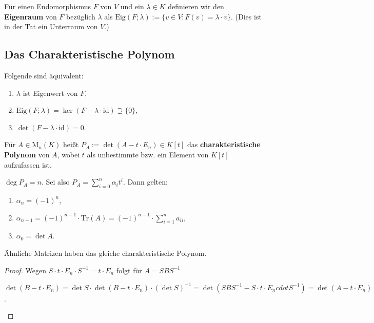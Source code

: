 \begin{definition} Für einen Endomorphismus $F$ von $V$ und ein $\lambda \in K$
definieren wir den \textbf{Eigenraum} von $F$ bezüglich $\lambda$ als
$\text{Eig}( F ; \lambda ) := \{ v \in V: F(v) = \lambda \cdot v \}$. (Dies ist
in der Tat ein Unterraum von $V$.)
\end{definition}

\subsection{Das Charakteristische Polynom}

\begin{bemerkung} Folgende sind äquivalent:
\begin{enumerate}[label=\roman*)]
\item $\lambda$ ist Eigenwert von $F$,
\item $\text{Eig}(F; \lambda) = \ker (F - \lambda \cdot \text{id}) \supsetneq
\{ 0 \}$,
\item $\det (F - \lambda \cdot \text {id}) = 0$.
\end{enumerate}
\end{bemerkung}

\begin{definition} Für $A \in \text{M}_n(K)$ heißt $P_A := \det (A - t \cdot
E_n) \in K[t]$ das \textbf{charakteristische Polynom} von $A$, wobei $t$ als
unbestimmte bzw. ein Element von $K[t]$ aufzufassen ist.
\end{definition}

\begin{bemerkung} $\deg P_A = n$. Sei also $P_A = \sum_{i=0}^n \alpha_i t^i $.
Dann gelten:
\begin{enumerate}[label = \roman*)]
\item $\alpha_n = (-1)^n$,
\item $\alpha_{n-1} = (-1)^{n-1} \cdot \text{Tr}(A) = (-1)^{n-1} \cdot
\sum_{i=1}^n a_{ii}$,
\item $\alpha_0 = \det A$.
\end{enumerate}
\end{bemerkung}

\begin{lemma} Ähnliche Matrizen haben das gleiche charakteristische Polynom.
\end{lemma}
\begin{proof}
Wegen $S \cdot t \cdot E_n \cdot S^{-1} = t \cdot E_n $ folgt
für $A = S B S^{-1}$
\begin{center}
$\det (B - t \cdot E_n) = \det S \cdot \det (B - t \cdot E_n) \cdot (\det S)^{-1}
= \det ( SBS^{-1} - S \cdot t \cdot E_n cdot S^{-1}) =\det ( A - t \cdot E_n)$.
\end{center}
\end{proof}

